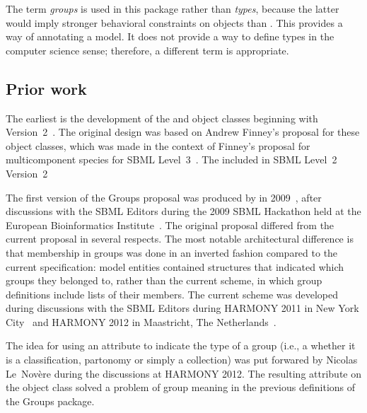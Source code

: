 The term \emph{groups} is used in this package rather than \emph{types}, because the latter would imply stronger behavioral constraints on objects than . This  provides a way of annotating a model.  It does not provide a way to define types in the computer science sense; therefore, a different term is appropriate.


\subsection{Prior work}

The earliest  is the development of the \CompartmentType and \SpeciesType object classes  beginning with Version~2~\citep{l2v2}. The original design was based on Andrew Finney's proposal for these object classes, which was made in the context of Finney's proposal for multicomponent species for SBML Level~3~\citep{finney_2004}.  The \SpeciesType {} included in SBML Level~2 Version~2

The first version of the Groups proposal was produced by  in 2009~\citep{hucka_2009}, after discussions with the SBML Editors during the 2009 SBML Hackathon held at the European Bioinformatics Institute~\citep{sbml_hackathon_2009}.  The original proposal differed from the current proposal in several respects. The most notable architectural difference is that membership in groups was done in an inverted fashion compared to the current specification: model entities contained structures that indicated which groups they belonged to, rather than the current scheme, in which group definitions include lists of their members.  The current scheme was developed during discussions with the SBML Editors during HARMONY 2011 in New York City~\citep{harmony_2011} and HARMONY 2012 in Maastricht, The Netherlands~\citep{harmony_2012}.

The idea for using an attribute to indicate the type of a group (i.e., a whether it is a classification, partonomy or simply a collection) was put forwared by Nicolas Le~Nov\`{e}re during the discussions at HARMONY 2012.  The resulting attribute  on the \Group object class solved a problem of group meaning in the previous definitions of the Groups package.

